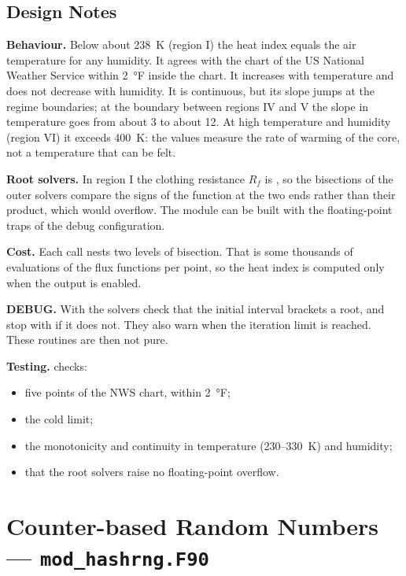 \subsection{Design Notes}

\textbf{Behaviour.} Below about 238~K (region I) the heat index equals the
air temperature for any humidity. It agrees with the chart of the US
National Weather Service within 2~°F inside the chart. It increases with
temperature and does not decrease with humidity. It is continuous, but its
slope jumps at the regime boundaries; at the boundary between regions IV
and V the slope in temperature goes from about 3 to about 12. At high
temperature and humidity (region VI) it exceeds 400~K: the values
measure the rate of warming of the core, not a temperature that can be
felt.

\textbf{Root solvers.} In region I the clothing resistance $R_f$ is
, so the bisections of the outer solvers compare the signs of
the function at the two ends rather than their product, which would
overflow. The module can be built with the floating-point traps of the
debug configuration.

\textbf{Cost.} Each call nests two levels of bisection. That is
some thousands of evaluations of the flux functions per point, so the
heat index is computed only when the  output is enabled.

\textbf{DEBUG.} With  the solvers check that the initial
interval brackets a root, and stop with  if it does not. They
also warn when the iteration limit is reached. These routines are then not
pure.

\textbf{Testing.}  checks:
\begin{itemize}
  \item five points of the NWS chart, within 2~°F;
  \item the cold limit;
  \item the monotonicity and continuity in temperature (230--330~K) and
    humidity;
  \item that the root solvers raise no floating-point overflow.
\end{itemize}


\section{Counter-based Random Numbers --- \texttt{mod\_hashrng.F90}}
\label{sec:hashrng}

